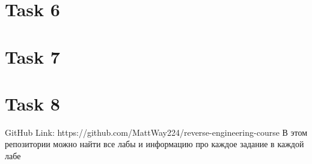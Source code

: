     \section*{Task 6}
    

    \section*{Task 7}
    

    \section*{Task 8}
    

    \begin{thebibliography}{1}
        GitHub Link: https://github.com/MattWay224/reverse-engineering-course
        В этом репозитории можно найти все лабы и информацию про каждое задание в каждой лабе
    \end{thebibliography}

